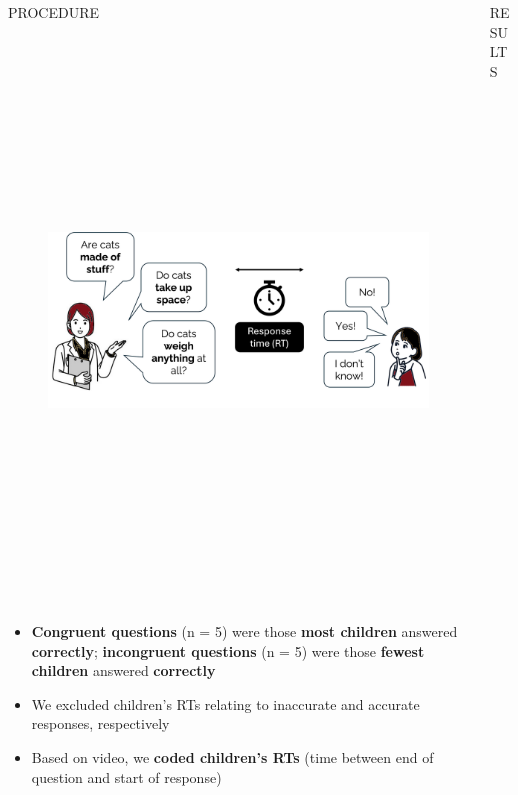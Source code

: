 \documentclass[final]{beamer}
\newlength{\colwidth}
\newlength{\widecolwidth}
\begin{document}
\begin{frame}[t]
\begin{columns}[t]
\begin{column}{\colwidth}
\begin{block}{PROCEDURE}
    \begin{figure}
      \centering
	{\includegraphics[height=15cm]{images/procedure5.png}}
    \end{figure}

    \begin{itemize}
    	\item \textbf{Congruent questions} (n = 5) were those \textbf{most children} answered \textbf{correctly}; \textbf{incongruent questions} (n = 5) were those \textbf{fewest children} answered \textbf{correctly}
	\item We excluded children's RTs relating to inaccurate and accurate responses, respectively
	\item Based on video, we \textbf{coded children's RTs} (time between end of question and start of response)
    \end{itemize}
    
  \end{block}

\end{column}

\begin{column}{\widecolwidth}

  \begin{block}{RESULTS}


\end{block}
\end{column}
\end{columns}
\end{frame}
\end{document}
